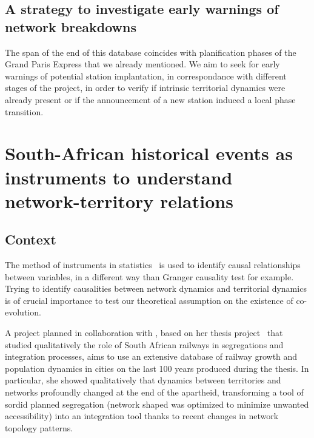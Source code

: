 \subsection{A strategy to investigate early warnings of network breakdowns}


The span of the end of this database coincides with planification phases of the Grand Paris Express that we already mentioned. We aim to seek for early warnings of potential station implantation, in correspondance with different stages of the project, in order to verify if intrinsic territorial dynamics were already present or if the announcement of a new station induced a local phase transition.






\newpage

\section[South-African historical events as instruments]{South-African historical events as instruments to understand network-territory relations}

\subsection{Context}

The method of instruments in statistics~\cite{angrist1996identification} is used to identify causal relationships between variables, in a different way than Granger causality test for example. Trying to identify causalities between network dynamics and territorial dynamics is of crucial importance to test our theoretical assumption on the existence of co-evolution.

A project planned in collaboration with , based on her thesis project~\cite{baffi2016thesis} that studied qualitatively the role of South African railways in segregations and integration processes, aims to use an extensive database of railway growth and population dynamics in cities on the last 100 years produced during the thesis. In particular, she showed qualitatively that dynamics between territories and networks profoundly changed at the end of the apartheid, transforming a tool of sordid planned segregation (network shaped was optimized to minimize unwanted accessibility) into an integration tool thanks to recent changes in network topology patterns.

